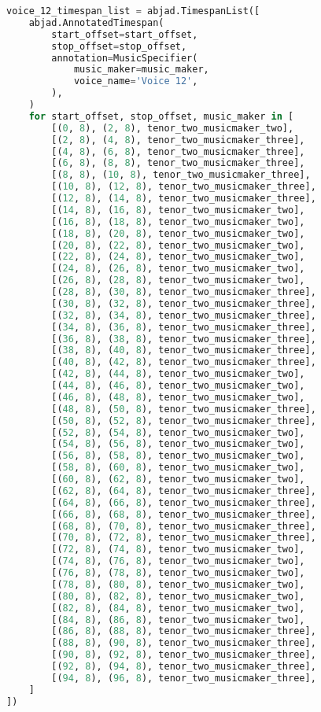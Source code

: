 \begin{lstlisting}[language=Python, caption=Invocation Source Code]
voice_12_timespan_list = abjad.TimespanList([
    abjad.AnnotatedTimespan(
        start_offset=start_offset,
        stop_offset=stop_offset,
        annotation=MusicSpecifier(
            music_maker=music_maker,
            voice_name='Voice 12',
        ),
    )
    for start_offset, stop_offset, music_maker in [
        [(0, 8), (2, 8), tenor_two_musicmaker_two],
        [(2, 8), (4, 8), tenor_two_musicmaker_three],
        [(4, 8), (6, 8), tenor_two_musicmaker_three],
        [(6, 8), (8, 8), tenor_two_musicmaker_three],
        [(8, 8), (10, 8), tenor_two_musicmaker_three],
        [(10, 8), (12, 8), tenor_two_musicmaker_three],
        [(12, 8), (14, 8), tenor_two_musicmaker_three],
        [(14, 8), (16, 8), tenor_two_musicmaker_two],
        [(16, 8), (18, 8), tenor_two_musicmaker_two],
        [(18, 8), (20, 8), tenor_two_musicmaker_two],
        [(20, 8), (22, 8), tenor_two_musicmaker_two],
        [(22, 8), (24, 8), tenor_two_musicmaker_two],
        [(24, 8), (26, 8), tenor_two_musicmaker_two],
        [(26, 8), (28, 8), tenor_two_musicmaker_two],
        [(28, 8), (30, 8), tenor_two_musicmaker_three],
        [(30, 8), (32, 8), tenor_two_musicmaker_three],
        [(32, 8), (34, 8), tenor_two_musicmaker_three],
        [(34, 8), (36, 8), tenor_two_musicmaker_three],
        [(36, 8), (38, 8), tenor_two_musicmaker_three],
        [(38, 8), (40, 8), tenor_two_musicmaker_three],
        [(40, 8), (42, 8), tenor_two_musicmaker_three],
        [(42, 8), (44, 8), tenor_two_musicmaker_two],
        [(44, 8), (46, 8), tenor_two_musicmaker_two],
        [(46, 8), (48, 8), tenor_two_musicmaker_two],
        [(48, 8), (50, 8), tenor_two_musicmaker_three],
        [(50, 8), (52, 8), tenor_two_musicmaker_three],
        [(52, 8), (54, 8), tenor_two_musicmaker_two],
        [(54, 8), (56, 8), tenor_two_musicmaker_two],
        [(56, 8), (58, 8), tenor_two_musicmaker_two],
        [(58, 8), (60, 8), tenor_two_musicmaker_two],
        [(60, 8), (62, 8), tenor_two_musicmaker_two],
        [(62, 8), (64, 8), tenor_two_musicmaker_three],
        [(64, 8), (66, 8), tenor_two_musicmaker_three],
        [(66, 8), (68, 8), tenor_two_musicmaker_three],
        [(68, 8), (70, 8), tenor_two_musicmaker_three],
        [(70, 8), (72, 8), tenor_two_musicmaker_three],
        [(72, 8), (74, 8), tenor_two_musicmaker_two],
        [(74, 8), (76, 8), tenor_two_musicmaker_two],
        [(76, 8), (78, 8), tenor_two_musicmaker_two],
        [(78, 8), (80, 8), tenor_two_musicmaker_two],
        [(80, 8), (82, 8), tenor_two_musicmaker_two],
        [(82, 8), (84, 8), tenor_two_musicmaker_two],
        [(84, 8), (86, 8), tenor_two_musicmaker_two],
        [(86, 8), (88, 8), tenor_two_musicmaker_three],
        [(88, 8), (90, 8), tenor_two_musicmaker_three],
        [(90, 8), (92, 8), tenor_two_musicmaker_three],
        [(92, 8), (94, 8), tenor_two_musicmaker_three],
        [(94, 8), (96, 8), tenor_two_musicmaker_three],
    ]
])


\end{lstlisting}
